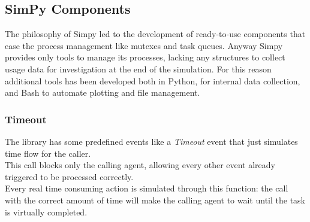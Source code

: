 \subsection{SimPy Components}
The philosophy of Simpy led to the development of ready-to-use components
that ease the process management like mutexes and task queues.
Anyway Simpy provides only tools to manage its processes, lacking any
structures to collect usage data for investigation at the end of the simulation.
For this reason additional tools has been developed both in Python, for internal
data collection, and Bash to automate plotting and file management.

\subsubsection{Timeout}
The library has some predefined events like a \textit{Timeout} event that just
simulates time flow for the caller.\\
This call blocks only the calling agent, allowing every other event already
triggered to be processed correctly. \\
Every real time consuming action is simulated through this function: the call
with the correct amount of time will make the calling agent to wait until the
task is virtually completed.

